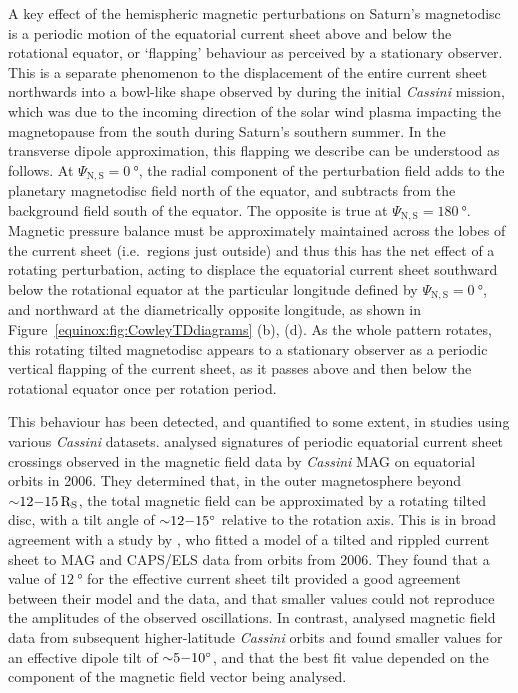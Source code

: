 A key effect of the hemispheric magnetic perturbations on Saturn's magnetodisc is a periodic motion of the equatorial current sheet above and below the rotational equator, or `flapping' behaviour as perceived by a stationary observer. This is a separate phenomenon to the displacement of the entire current sheet northwards into a bowl-like shape observed by \citet{arridge2008warp} during the initial \textit{Cassini} mission, which was due to the incoming direction of the solar wind plasma impacting the magnetopause from the south during Saturn's southern summer. In the transverse dipole approximation, this flapping we describe can be understood as follows. At $\Psi_\mathrm{N,S} = \SI{0}{\degree}$, the radial component of the perturbation field adds to the planetary magnetodisc field north of the equator, and subtracts from the background field south of the equator. The opposite is true at $\Psi_\mathrm{N,S} = \SI{180}{\degree}$. Magnetic pressure balance must be approximately maintained across the lobes of the current sheet (i.e.\ regions just outside)  and thus this has the net effect of a rotating perturbation, acting to displace the equatorial current sheet southward below the rotational equator at the particular longitude defined by $\Psi_\mathrm{N,S} = \SI{0}{\degree}$, and northward at the diametrically opposite longitude, as shown in Figure~\ref{equinox:fig:CowleyTDdiagrams} (b), (d). As the whole pattern rotates, this rotating tilted magnetodisc appears to a stationary observer as a periodic vertical flapping of the current sheet, as it passes above and then below the rotational equator once per rotation period. 

This behaviour has been detected, and quantified to some extent, in studies using various \textit{Cassini} datasets. \citet{southwood2007} analysed signatures of periodic equatorial current sheet crossings observed in the magnetic field data by \textit{Cassini} MAG on equatorial orbits in 2006. They determined that, in the outer magnetosphere beyond ${\sim}12{\--}\SI{15}{R_S}$, the total magnetic field can be approximated by a rotating tilted disc, with a tilt angle of ${\sim}12{\--}\SI{15}{\degree}$ relative to the rotation axis. This is in broad agreement with a study by \citet{arridge2011}, who fitted a model of a tilted and rippled current sheet to MAG and CAPS/ELS data from orbits from 2006. They found that a value of $\SI{12}{\degree}$ for the effective current sheet tilt provided a good agreement between their model and the data, and that smaller values could not reproduce the amplitudes of the observed oscillations. In contrast, \citet{provan2009} analysed magnetic field data from subsequent higher-latitude \textit{Cassini} orbits and found smaller values for an effective dipole tilt of ${\sim}5{\--}\SI{10}{\degree}$, and that the best fit value depended on the component of the magnetic field vector being analysed. 


